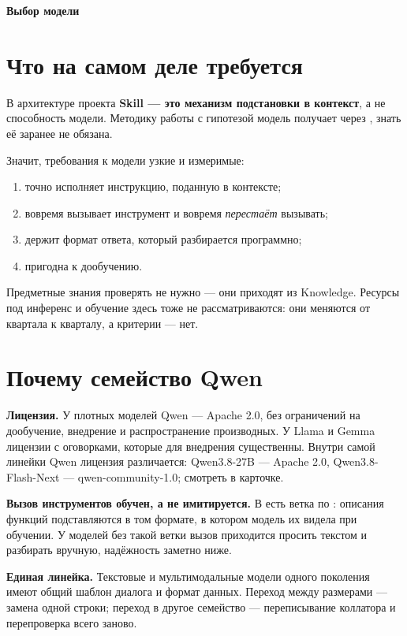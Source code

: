 \documentclass[11pt,a4paper]{article}
\begin{document}
{\Large\bfseries Выбор модели}

\vspace{-0.5em}

\section{Что на самом деле требуется}

В архитектуре проекта \textbf{Skill — это механизм подстановки в контекст},
а не способность модели. Методику работы с гипотезой модель получает через
, знать её заранее не обязана.

Значит, требования к модели узкие и измеримые:

\begin{enumerate}
\item точно исполняет инструкцию, поданную в контексте;
\item вовремя вызывает инструмент и вовремя \emph{перестаёт} вызывать;
\item держит формат ответа, который разбирается программно;
\item пригодна к дообучению.
\end{enumerate}

Предметные знания проверять не нужно — они приходят из Knowledge.
Ресурсы под инференс и обучение здесь тоже не рассматриваются: они
меняются от квартала к кварталу, а критерии — нет.

\section{Почему семейство Qwen}

\textbf{Лицензия.} У плотных моделей Qwen --- Apache 2.0, без ограничений
на дообучение, внедрение и распространение производных. У Llama и Gemma
лицензии с оговорками, которые для внедрения существенны. Внутри самой
линейки Qwen лицензия различается: Qwen3.8-27B --- Apache 2.0,
Qwen3.8-Flash-Next --- qwen-community-1.0; смотреть в карточке.

\textbf{Вызов инструментов обучен, а не имитируется.} В 
есть ветка по : описания функций подставляются в том формате,
в котором модель их видела при обучении. У моделей без такой ветки вызов
приходится просить текстом и разбирать вручную, надёжность заметно ниже.

\textbf{Единая линейка.} Текстовые и мультимодальные модели одного
поколения имеют общий шаблон диалога и формат данных. Переход между
размерами — замена одной строки; переход в другое семейство —
переписывание коллатора и перепроверка всего заново.
\end{document}
